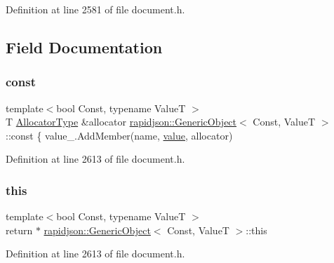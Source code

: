 Definition at line 2581 of file document.\+h.



\subsection{Field Documentation}
\mbox{\label{classrapidjson_1_1_generic_object_a3524fcb5f36c034aabd8afa19fc16d9e}} 
\subsubsection{\texorpdfstring{const}{const}}
{\footnotesize\ttfamily template$<$bool Const, typename ValueT $>$ \\
T \mbox{\hyperlink{classrapidjson_1_1_generic_object_ae30003e248368737382eed69ec8fe1eb}{Allocator\+Type}} \&allocator \mbox{\hyperlink{classrapidjson_1_1_generic_object}{rapidjson\+::\+Generic\+Object}}$<$ Const, ValueT $>$\+::const \{ value\+\_\+.\+Add\+Member(name, \mbox{\hyperlink{classrapidjson_1_1_generic_object_afdba35584d4b33d5ab8c0c460f49c0a4}{value}}, allocator)}



Definition at line 2613 of file document.\+h.

\mbox{\label{classrapidjson_1_1_generic_object_a16b86f62bb90bec993009f61b62a3210}} 
\subsubsection{\texorpdfstring{this}{this}}
{\footnotesize\ttfamily template$<$bool Const, typename ValueT $>$ \\
return $\ast$ \mbox{\hyperlink{classrapidjson_1_1_generic_object}{rapidjson\+::\+Generic\+Object}}$<$ Const, ValueT $>$\+::this}



Definition at line 2613 of file document.\+h.

\mbox{\label{classrapidjson_1_1_generic_object_afdba35584d4b33d5ab8c0c460f49c0a4}} 
